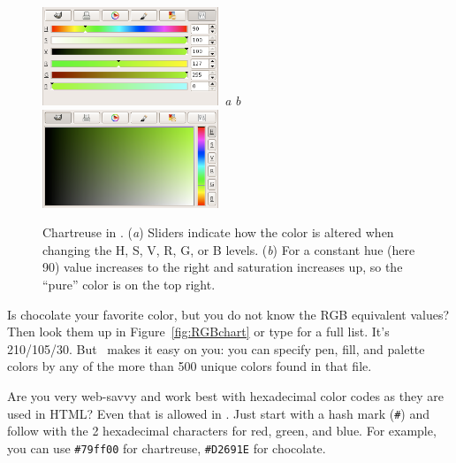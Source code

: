 \begin{figure}[b]
   \includegraphics[width=0.47\textwidth,bb=0 0 375 209]{fig/gimp-sliders.png}~\emph{a}\hfill
   \emph{b}~\includegraphics[width=0.47\textwidth,bb=0 0 375 209]{fig/gimp-panel.png}
   \caption{Chartreuse in . (\emph{a}) Sliders indicate how the color is altered when changing the H, S, V, R, G, or B levels. (\emph{b}) For a constant hue (here 90\DS) value increases to the right and saturation increases up, so the ``pure'' color is on the top right.}
   \label{fig:gimp}
\end{figure}

Is chocolate your favorite color, but you do not know the RGB equivalent values? Then look them up in Figure~\ref{fig:RGBchart} or type  for a full list. It's 210/105/30. But \GMT\ makes it easy on you: you can specify pen, fill, and palette colors by any of the more than 500 unique colors found in that file.

Are you very web-savvy and work best with hexadecimal color codes as they are used in HTML? Even that is allowed in \GMT. Just start with a hash mark (\texttt{\#}) and follow with the 2 hexadecimal characters for red, green, and blue. For example, you can use \texttt{\#79ff00} for chartreuse, \texttt{\#D2691E} for chocolate.

